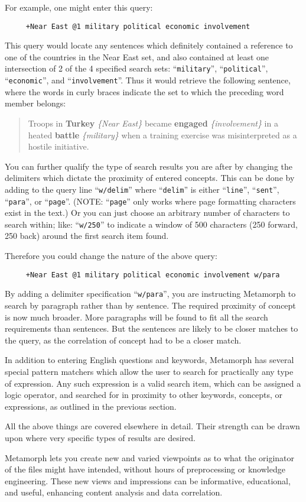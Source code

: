      For example, one might enter this query:
\begin{verbatim}
     +Near East @1 military political economic involvement
\end{verbatim}

This query would locate any sentences which definitely contained a
reference to one of the countries in the Near East set, and also
contained at least one intersection of 2 of the 4 specified search
sets:  ``\verb`military`'', ``\verb`political`'', ``\verb`economic`'',
and ``\verb`involvement`''.  Thus it would retrieve the following
sentence, where the words in curly braces indicate the set to which
the preceding word member belongs:

\begin{quote}
      Troops in {\bf Turkey} {\em \{Near East\}} became {\bf engaged}
      {\em \{involvement\}} in a heated {\bf battle} {\em \{military\}}
      when a training exercise was misinterpreted as a hostile initiative.
\end{quote}

You can further qualify the type of search results you are after by
changing the delimiters which dictate the proximity of entered
concepts.  This can be done by adding to the query line
``\verb`w/delim`'' where ``\verb`delim`'' is either ``\verb`line`'',
``\verb`sent`'', ``\verb`para`'', or ``\verb`page`''.  (NOTE:
``\verb`page`'' only works where page formatting characters exist in
the text.)  Or you can just choose an arbitrary number of characters
to search within; like:  ``\verb`w/250`'' to indicate a window of 500
characters (250 forward, 250 back) around the first search item found.

     Therefore you could change the nature of the above query:
\begin{verbatim}
     +Near East @1 military political economic involvement w/para
\end{verbatim}

By adding a delimiter specification ``\verb`w/para`'', you are
instructing Metamorph to search by paragraph rather than by sentence.
The required proximity of concept is now much broader.  More
paragraphs will be found to fit all the search requirements than
sentences.  But the sentences are likely to be closer matches to the
query, as the correlation of concept had to be a closer match.

In addition to entering English questions and keywords, Metamorph has
several special pattern matchers which allow the user to search for
practically any type of expression.  Any such expression is a valid
search item, which can be assigned a logic operator, and searched for
in proximity to other keywords, concepts, or expressions, as outlined
in the previous section.

All the above things are covered elsewhere in detail. Their strength
can be drawn upon where very specific types of results are desired.

Metamorph lets you create new and varied viewpoints as to what the
originator of the files might have intended, without hours of
preprocessing or knowledge engineering.  These new views and
impressions can be informative, educational, and useful, enhancing
content analysis and data correlation.
